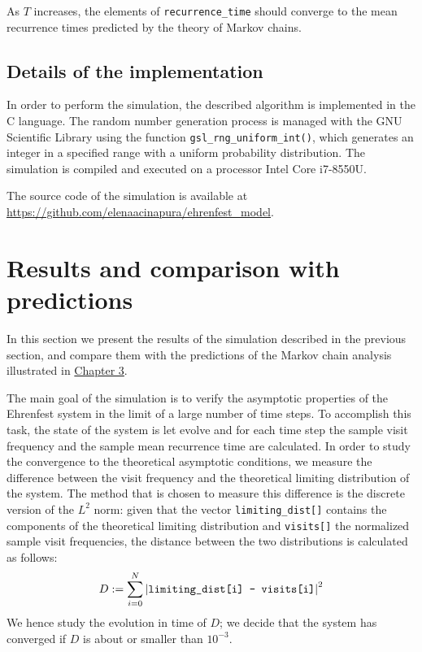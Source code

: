 As $T$ increases, the elements of \texttt{recurrence\_time} should converge to the mean recurrence times predicted by the theory of Markov chains.

\subsection{Details of the implementation}
In order to perform the simulation, the described algorithm is implemented in the C language. The random number generation process is managed with the GNU Scientific Library using the function \texttt{gsl\_rng\_uniform\_int()}, which generates an integer in a specified range with a uniform probability distribution. The simulation is compiled and executed on a processor Intel Core i7-8550U.

The source code of the simulation is available at \url{https://github.com/elenaacinapura/ehrenfest_model}.

\section{Results and comparison with predictions}
In this section we present the results of the simulation described in the previous section, and compare them with the predictions of the Markov chain analysis illustrated in \hyperref[ch:3]{Chapter 3}.

The main goal of the simulation is to verify the asymptotic properties of the Ehrenfest system in the limit of a large number of time steps. To accomplish this task, the state of the system is let evolve and for each time step the sample visit frequency and the sample mean recurrence time are calculated. In order to study the convergence to the theoretical asymptotic conditions, we measure the difference between the visit frequency and the theoretical limiting distribution of the system. The method that is chosen to measure this difference is the discrete version of the $L^2$ norm: given that the vector \texttt{limiting\_dist[]} contains the components of the theoretical limiting distribution and \texttt{visits[]} the normalized sample visit frequencies, the distance between the two distributions is calculated as follows:
\begin{equation} \label{eq:distance}
    D := \sum_{i = 0}^{N} \left|\text{\texttt{limiting\_dist[i] - visits[i]}} \right| ^2
\end{equation}
We hence study the evolution in time of $D$; we decide that the system has converged if $D$ is about or smaller than $10^{-3}$.

